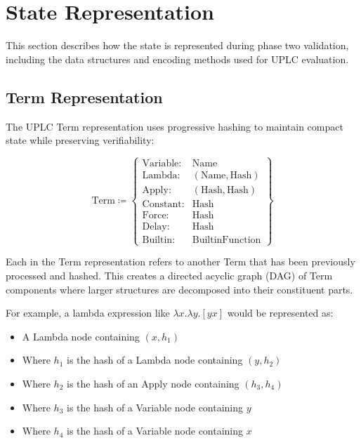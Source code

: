 \documentclass[../midgard.tex]{subfiles}
\begin{document}
\section{State Representation}
\label{s:phase-two-state-representation}

This section describes how the state is represented during phase two validation, including the data structures and encoding methods used for UPLC evaluation.

\subsection{Term Representation}

The UPLC Term representation uses progressive hashing to maintain compact state while preserving verifiability:

\begin{equation*}
    \text{Term} \coloneq \left\{
    \begin{array}{ll}
        \text{Variable} : & \text{Name} \\
        \text{Lambda} : & (\text{Name}, \text{Hash}) \\
        \text{Apply} : & (\text{Hash}, \text{Hash}) \\
        \text{Constant} : & \text{Hash} \\
        \text{Force} : & \text{Hash} \\
        \text{Delay} : & \text{Hash} \\
        \text{Builtin} : & \text{BuiltinFunction}
    \end{array} \right\}
\end{equation*}

Each  in the Term representation refers to another Term that has been previously processed and hashed. This creates a directed acyclic graph (DAG) of Term components where larger structures are decomposed into their constituent parts.

For example, a lambda expression like \(\lambda x.\lambda y.[y x]\) would be represented as:
\begin{itemize}
    \item A Lambda node containing \((x, h_1)\)
    \item Where \(h_1\) is the hash of a Lambda node containing \((y, h_2)\)
    \item Where \(h_2\) is the hash of an Apply node containing \((h_3, h_4)\)
    \item Where \(h_3\) is the hash of a Variable node containing \(y\)
    \item Where \(h_4\) is the hash of a Variable node containing \(x\)
\end{itemize}
\end{document}
